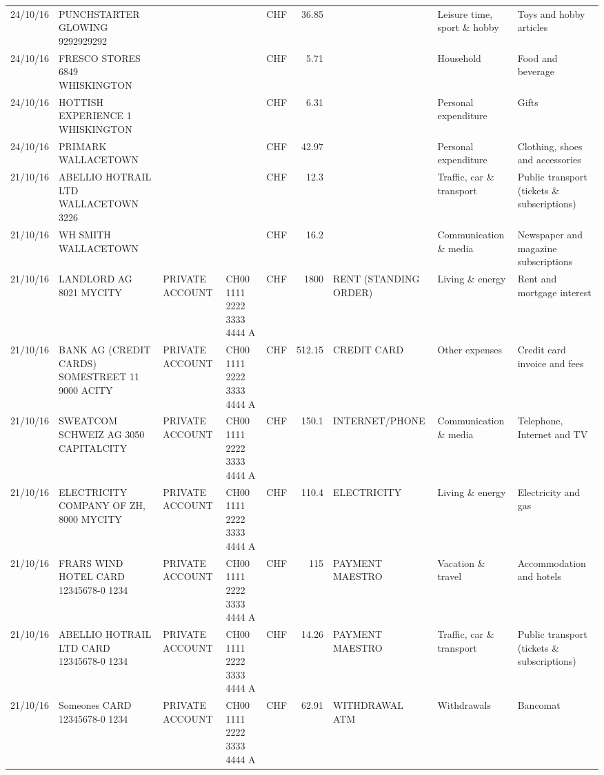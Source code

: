 \begin{landscape}
\begin{table}[h]
\begin{center}
\begin{tabular}{rllllrlll}
		24/10/16 & PUNCHSTARTER GLOWING   9292929292 &       &       & CHF   & 36.85 &       & Leisure time, sport \& hobby & Toys and hobby articles \\
		24/10/16 & FRESCO STORES 6849        WHISKINGTON &       &       & CHF   & 5.71  &       & Household & Food and beverage \\
		24/10/16 & HOTTISH EXPERIENCE 1    WHISKINGTON &       &       & CHF   & 6.31  &       & Personal expenditure & Gifts \\
		24/10/16 & PRIMARK                  WALLACETOWN &       &       & CHF   & 42.97 &       & Personal expenditure & Clothing, shoes and accessories \\
		21/10/16 & ABELLIO HOTRAIL LTD     WALLACETOWN 3226 &       &       & CHF   & 12.3  &       & Traffic, car \& transport & Public transport (tickets \& subscriptions) \\
		21/10/16 & WH SMITH                 WALLACETOWN &       &       & CHF   & 16.2  &       & Communication \& media & Newspaper and magazine subscriptions \\
		21/10/16 & LANDLORD AG 8021 MYCITY & PRIVATE ACCOUNT & CH00 1111 2222 3333 4444 A & CHF   & 1800  & RENT (STANDING ORDER) & Living \& energy & Rent and mortgage interest \\
		21/10/16 & BANK AG (CREDIT CARDS) SOMESTREET 11 9000 ACITY & PRIVATE ACCOUNT & CH00 1111 2222 3333 4444 A & CHF   & 512.15 & CREDIT CARD & Other expenses & Credit card invoice and fees \\
		21/10/16 & SWEATCOM SCHWEIZ AG 3050 CAPITALCITY & PRIVATE ACCOUNT & CH00 1111 2222 3333 4444 A & CHF   & 150.1 & INTERNET/PHONE & Communication \& media & Telephone,  Internet and TV \\
		21/10/16 & ELECTRICITY COMPANY OF ZH, 8000 MYCITY & PRIVATE ACCOUNT & CH00 1111 2222 3333 4444 A & CHF   & 110.4 & ELECTRICITY & Living \& energy & Electricity and gas \\
		21/10/16 & FRARS WIND HOTEL CARD 12345678-0 1234 & PRIVATE ACCOUNT & CH00 1111 2222 3333 4444 A & CHF   & 115   & PAYMENT MAESTRO & Vacation \& travel & Accommodation and hotels \\
		21/10/16 & ABELLIO HOTRAIL LTD CARD 12345678-0 1234 & PRIVATE ACCOUNT & CH00 1111 2222 3333 4444 A & CHF   & 14.26 & PAYMENT MAESTRO & Traffic, car \& transport & Public transport (tickets \& subscriptions) \\
		21/10/16 & Someones CARD 12345678-0 1234 & PRIVATE ACCOUNT & CH00 1111 2222 3333 4444 A & CHF   & 62.91 & WITHDRAWAL ATM & Withdrawals & Bancomat \\

\end{tabular}
\end{center}
\end{table}
\end{landscape}
